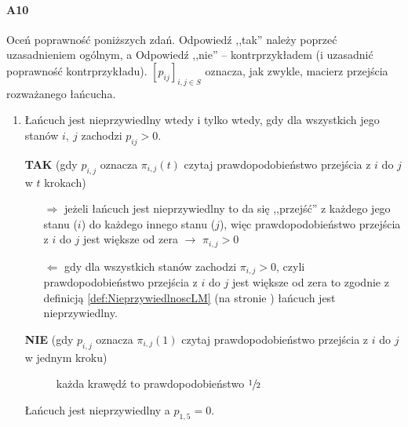 \documentclass[a4paper,12pt]{article}
\theoremstyle{definition}%
\theoremstyle{definition}
\theoremstyle{problem}
\begin{document}
\paragraph{A10} Oceń poprawność poniższych zdań. Odpowiedź ,,tak” należy poprzeć uzasadnieniem ogólnym, a Odpowiedź ,,nie” – kontrprzykładem (i uzasadnić poprawność kontrprzykładu). $\left[ p_{ij} \right]_{i,j\in S}$ oznacza, jak zwykle, macierz przejścia rozważanego łańcucha.
\begin{enumerate}[label=\alph*)]
\item Łańcuch jest nieprzywiedlny wtedy i tylko wtedy, gdy dla wszystkich jego stanów $i,\ j$ zachodzi $p_{ij} > 0$.

\textbf{TAK} (gdy $p_{i,j}$ oznacza $\pi_{i,j}(t)$ czytaj prawdopodobieństwo przejścia z $i$ do $j$ w $t$ krokach)
\begin{itemize}
\item[$\Rightarrow$] jeżeli łańcuch jest nieprzywiedlny to  da się ,,przejść'' z każdego jego stanu ($i$) do każdego innego stanu ($j$), więc prawdopodobieństwo przejścia z $i$ do $j$ jest większe od zera $\rightarrow$ $\pi _{i,j} > 0$
\item[$\Leftarrow$] gdy dla wszystkich stanów zachodzi $\pi _{i,j} > 0$, czyli  prawdopodobieństwo przejścia z $i$ do $j$ jest większe od zera to zgodnie z definicją \ref{def:NieprzywiedlnoscLM} (na stronie \pageref{def:NieprzywiedlnoscLM}) łańcuch jest nieprzywiedlny. 
\end{itemize}
\textbf{NIE} (gdy $p_{i,j}$ oznacza $\pi_{i,j}(1)$ czytaj prawdopodobieństwo przejścia z $i$ do $j$ w jednym kroku)
\begin{figure}[H]
\centering
{}
\caption*{każda krawędź to prawdopodobieństwo $\sfrac{1}{2}$}
\end{figure}
Łańcuch jest nieprzywiedlny a $p_{1,5}=0$.


\end{enumerate}
\end{document}
